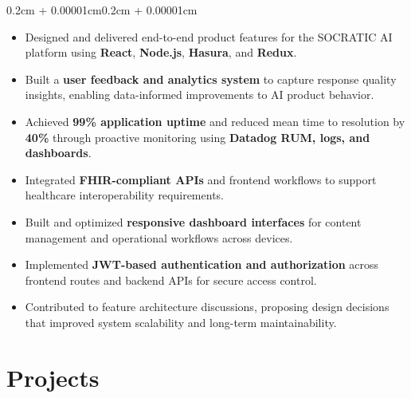 \documentclass[10pt, letterpaper]{article}
\newenvironment{highlights}{
    \begin{itemize}[
        topsep=0.10cm,
        parsep=0.10cm,
        partopsep=0pt,
        itemsep=0pt,
        leftmargin=0.4cm + 10pt
    ]
}{
    \end{itemize}
}
\newenvironment{onecolentry}{
    \begin{adjustwidth}{0.2cm + 0.00001cm}{0.2cm + 0.00001cm}
}{
    \end{adjustwidth}
}
\begin{document}
\vspace{0.10cm}
\begin{onecolentry}
    \begin{highlights}
        \item Designed and delivered end-to-end product features for the SOCRATIC AI platform using \textbf{React}, \textbf{Node.js}, \textbf{Hasura}, and \textbf{Redux}.
        
        \item Built a \textbf{user feedback and analytics system} to capture response quality insights, enabling data-informed improvements to AI product behavior.
        
        \item Achieved \textbf{99\% application uptime} and reduced mean time to resolution by \textbf{40\%} through proactive monitoring using \textbf{Datadog RUM, logs, and dashboards}.
        
        \item Integrated \textbf{FHIR-compliant APIs} and frontend workflows to support healthcare interoperability requirements.
        
        \item Built and optimized \textbf{responsive dashboard interfaces} for content management and operational workflows across devices.
        
        \item Implemented \textbf{JWT-based authentication and authorization} across frontend routes and backend APIs for secure access control.
        
        \item Contributed to feature architecture discussions, proposing design decisions that improved system scalability and long-term maintainability.


        
        
    \end{highlights}
\end{onecolentry}

\section{Projects}
\end{document}

